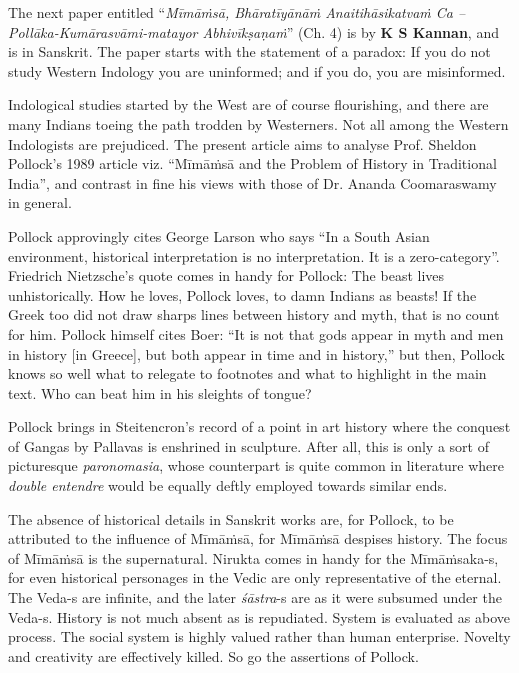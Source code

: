 The next paper entitled “\textit{Mīmāṁsā, Bhāratīyānāṁ Anaitihāsikatvaṁ Ca – Pollāka-Kumārasvāmi-matayor Abhivīkṣaṇaṁ}” (Ch. 4) is by \textbf{K S Kannan}, and is in Sanskrit. The paper starts with the statement of a paradox: If you do not study Western Indology you are uninformed; and if you do, you are misinformed.

Indological studies started by the West are of course flourishing, and there are many Indians toeing the path trodden by Westerners. Not all among the Western Indologists are prejudiced. The present article aims to analyse Prof. Sheldon Pollock’s 1989 article viz. “Mīmāṁsā and the Problem of History in Traditional India”, and contrast in fine his views with those of Dr. Ananda Coomaraswamy in general.

 Pollock approvingly cites George Larson who says “In a South Asian environment, historical interpretation is no interpretation. It is a zero-category”. Friedrich Nietzsche’s quote comes in handy for Pollock: The beast lives unhistorically. How he loves, Pollock loves, to damn Indians as beasts! If the Greek too did not draw sharps lines between history and myth, that is no count for him. Pollock himself cites Boer: “It is not that gods appear in myth and men in history [in Greece], but both appear in time and in history,” but then, Pollock knows so well what to relegate to footnotes and what to highlight in the main text. Who can beat him in his sleights of tongue?

Pollock brings in Steitencron’s record of a point in art history where the conquest of Gangas by Pallavas is enshrined in sculpture. After all, this is only a sort of picturesque \textit{paronomasia}, whose counterpart is quite common in literature where \textit{double entendre} would be equally deftly employed towards similar ends. 

The absence of historical details in Sanskrit works are, for Pollock, to be attributed to the influence of Mīmāṁsā, for Mīmāṁsā despises history. The focus of Mīmāṁsā is the supernatural. Nirukta comes in handy for the Mīmāṁsaka-s,
 for even historical personages in the Vedic are only representative of the eternal. The Veda-s are infinite, and the later \textit{śāstra}-s are as it were subsumed under the Veda-s. History is not much absent as is repudiated. System is evaluated as above process. The social system is highly valued rather than human enterprise. Novelty and creativity are effectively killed. So go the assertions of Pollock.

